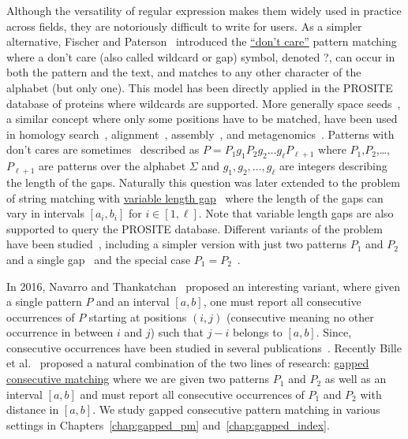Although the versatility of regular expression makes them widely used in practice across fields, they are notoriously difficult to write for users.
As a simpler alternative, Fischer and Paterson~\cite{fischer1974string} introduced the \underline{``don't care''} pattern matching where a don't care (also called wildcard or gap) symbol, denoted ?, can occur in both the pattern and the text, and matches to any other character of the alphabet (but only one).
This model has been directly applied in the PROSITE~\cite{hulo2006prosite} database of proteins where wildcards are supported. More generally space seeds~\cite{li2004patternhunter}, a similar concept where only some positions have to be matched, have been used in homology search~\cite{ma2002patternhunter}, alignment~\cite{david2011shrimp2}, assembly~\cite{birol2015spaced}, and metagenomics~\cite{bvrinda2015spaced}.
Patterns with don't cares are sometimes~\cite{lewenstein2011indexing} described as $P= P_1g_1P_2g_2 \dots g_\ell P_{\ell+1}$ where $P_1$,$P_2$,\dots,$P_{\ell+1}$ are patterns over the alphabet $\Sigma$ and $g_1,g_2,\dots,g_{\ell}$ are integers describing the length of the gaps. 
Naturally this question was later extended to the problem of string matching with \underline{variable length gap}~\cite{bille2012string,bille2014string} where the length of the gaps can vary in intervals $[a_i,b_i]$ for $i\in[1,\ell]$.
Note that variable length gaps are also supported to query the PROSITE database.
Different variants of the problem have been studied~\cite{kopelowitz2016color,cohen2009range,brodal1999finding}, including a simpler version with just two patterns $P_1$ and $P_2$ and a single gap~\cite{peterlongo2006gapped,iliopoulos2009indexing} and the special case $P_1=P_2$~\cite{muthukrishnan2002efficient,keller2007range}.

In 2016, Navarro and Thankatchan~\cite{NAVARRO2016108} proposed an interesting variant, where given a single pattern $P$ and an interval $[a,b]$, one must report all consecutive occurrences of $P$ starting at positions $(i,j)$ (consecutive meaning no other occurrence in between $i$ and $j$) such that $j-i$ belongs to $[a,b]$. Since, consecutive occurrences have been studied in several publications~\cite{DBLP:conf/fsttcs/BilleGPRS20,cpm/BilleGPS21,DBLP:journals/corr/abs-2304-00887,DBLP:journals/corr/abs-2211-16860}.
Recently Bille et al.~\cite{bille2022gapped} proposed a natural combination of the two lines of research: \underline{gapped consecutive matching} where we are given two patterns $P_1$ and $P_2$ as well as an interval $[a,b]$ and must report all consecutive occurrences of $P_1$ and $P_2$ with distance in $[a,b]$.
We study gapped consecutive pattern matching in various settings in Chapters~\ref{chap:gapped_pm} and~\ref{chap:gapped_index}.

